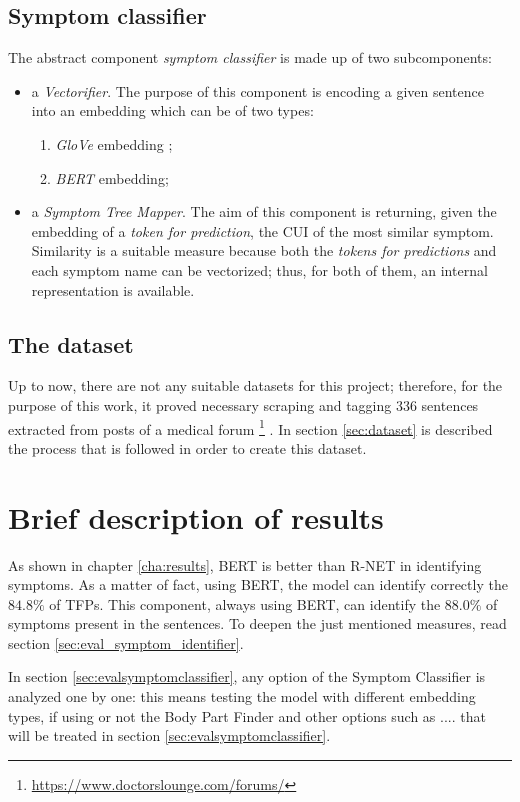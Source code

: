 \subsection*{Symptom classifier}
The abstract component \textit{symptom classifier} is made up of two subcomponents:
\begin{itemize}
  \item a \textit{Vectorifier}. The purpose of this component is encoding a given sentence into an embedding which can be of two types:
  \begin{enumerate}
    \item \textit{GloVe} embedding \cite{glove};
    \item \textit{BERT} embedding;
  \end{enumerate}
  \item a \textit{Symptom Tree Mapper}. The aim of this component is returning, given the embedding of a \textit{token for prediction}, the CUI of the most similar symptom. Similarity is a suitable measure because both the \textit{tokens for predictions} and each symptom name can be vectorized; thus, for both of them, an internal representation is available.
\end{itemize}

\subsection*{The dataset}
\label{datasetintro}
Up to now, there are not any suitable datasets for this project; therefore, for the purpose of this work, it proved necessary scraping and tagging $336$ sentences extracted from posts of a medical forum \footnote{\url{https://www.doctorslounge.com/forums/}} \cite{doctorslounge}. In section \ref{sec:dataset} is described the process that is followed in order to create this dataset.

\section{Brief description of results}
\label{sec:brief_results}
As shown in chapter \ref{cha:results}, BERT is better than R-NET in identifying symptoms. As a matter of fact, using BERT, the model can identify correctly the $84.8 \%$ of TFPs. This component, always using BERT, can identify the $88.0 \%$ of symptoms present in the sentences. To deepen the just mentioned measures, read section \ref{sec:eval_symptom_identifier}.

In section \ref{sec:evalsymptomclassifier}, any option of the Symptom Classifier is analyzed one by one: this means testing the model with different embedding types, if using or not the Body Part Finder and other options such as .... that will be treated in section \ref{sec:evalsymptomclassifier}.
